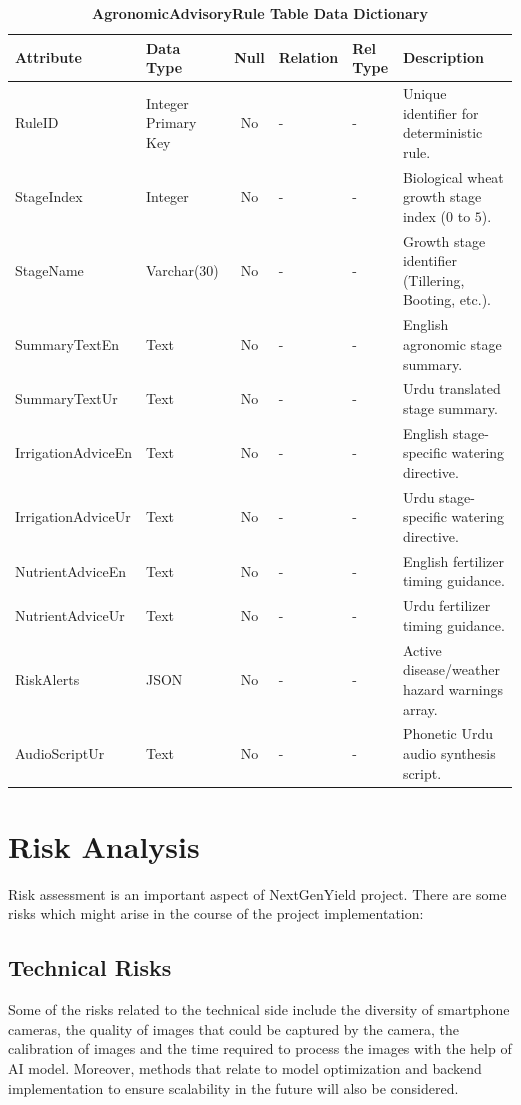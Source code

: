 \documentclass{FastFyp}
\begin{document}
\begin{table}[!htbp]
\footnotesize
\centering
\caption{\label{tab:advisory_table} \textbf{AgronomicAdvisoryRule Table Data Dictionary}}
\begin{tabular}{|l|l|c|l|l|p{4.5cm}|}
\hline
\textbf{Attribute} & \textbf{Data Type} & \textbf{Null} & \textbf{Relation} & \textbf{Rel Type} & \textbf{Description} \\ \hline
RuleID & Integer Primary Key & No & - & - & Unique identifier for deterministic rule. \\ \hline
StageIndex & Integer & No & - & - & Biological wheat growth stage index ($0$ to $5$). \\ \hline
StageName & Varchar(30) & No & - & - & Growth stage identifier (Tillering, Booting, etc.). \\ \hline
SummaryTextEn & Text & No & - & - & English agronomic stage summary. \\ \hline
SummaryTextUr & Text & No & - & - & Urdu translated stage summary. \\ \hline
IrrigationAdviceEn & Text & No & - & - & English stage-specific watering directive. \\ \hline
IrrigationAdviceUr & Text & No & - & - & Urdu stage-specific watering directive. \\ \hline
NutrientAdviceEn & Text & No & - & - & English fertilizer timing guidance. \\ \hline
NutrientAdviceUr & Text & No & - & - & Urdu fertilizer timing guidance. \\ \hline
RiskAlerts & JSON & No & - & - & Active disease/weather hazard warnings array. \\ \hline
AudioScriptUr & Text & No & - & - & Phonetic Urdu audio synthesis script. \\ \hline
\end{tabular}
\end{table}

\clearpage
\section{Risk Analysis}
Risk assessment is an important aspect of NextGenYield project. There are some risks which might arise in the course of the project implementation:

\subsection{Technical Risks}
Some of the risks related to the technical side include the diversity of smartphone cameras, the quality of images that could be captured by the camera, the calibration of images and the time required to process the images with the help of AI model. Moreover, methods that relate to model optimization and backend implementation to ensure scalability in the future will also be considered. 
\end{document}
